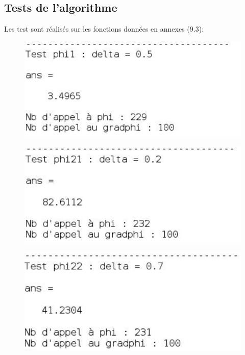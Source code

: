 \documentclass[a4paper,12pt]{article}
\theoremstyle{break}
\begin{document}
\subsection{Tests de l'algorithme}
Les test sont réalisés sur les fonctions données en annexes (9.3):
\begin{figure}[htbp]
	\centering
		\includegraphics{img/test1_newton_non_lineaire.PNG}
\end{figure}
\begin{figure}[htbp]
	\centering
		\includegraphics{img/test2_newton_non_lineaire.PNG}
\end{figure}
\begin{figure}[htbp]
	\centering
		\includegraphics{img/test3_newton_non_lineaire.PNG}
\end{figure}
\end{document}
